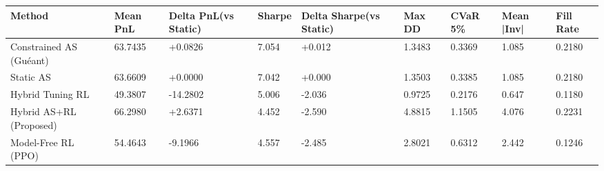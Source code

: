 \begin{tabular}{lllllllll}
\toprule
Method & Mean PnL & Delta PnL(vs Static) & Sharpe & Delta Sharpe(vs Static) & Max DD & CVaR 5\% & Mean |Inv| & Fill Rate \\
\midrule
Constrained AS (Guéant) & 63.7435 & +0.0826 & 7.054 & +0.012 & 1.3483 & 0.3369 & 1.085 & 0.2180 \\
Static AS & 63.6609 & +0.0000 & 7.042 & +0.000 & 1.3503 & 0.3385 & 1.085 & 0.2180 \\
Hybrid Tuning RL & 49.3807 & -14.2802 & 5.006 & -2.036 & 0.9725 & 0.2176 & 0.647 & 0.1180 \\
Hybrid AS+RL (Proposed) & 66.2980 & +2.6371 & 4.452 & -2.590 & 4.8815 & 1.1505 & 4.076 & 0.2231 \\
Model-Free RL (PPO) & 54.4643 & -9.1966 & 4.557 & -2.485 & 2.8021 & 0.6312 & 2.442 & 0.1246 \\
\bottomrule
\end{tabular}
